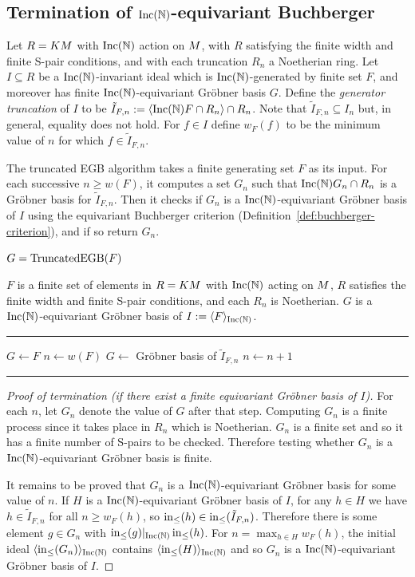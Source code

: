\subsection{Termination of $\operatorname{Inc}(\mathbb N)$-equivariant Buchberger}
Let $R = KM$ with $\operatorname{Inc}(\mathbb N)$ action on $M$, with $R$ satisfying the finite width and finite S-pair conditions, and with each truncation $R_n$ a Noetherian ring.  Let $I \subseteq R$ be a $\operatorname{Inc}(\mathbb N)$-invariant ideal which is $\operatorname{Inc}(\mathbb N)$-generated by finite set $F$, and moreover has finite $\operatorname{Inc}(\mathbb N)$-equivariant Gr\"obner basis $G$.  Define the {\em generator truncation} of $I$ to be $\tilde{I}_{F,n} := \langle \operatorname{Inc}(\mathbb N) F \cap R_n \rangle \cap R_n$.  Note that $\tilde{I}_{F,n} \subseteq I_n$ but, in general, equality does not hold.  For $f \in I$ define $w_F(f)$ to be the minimum value of $n$ for which $f \in \tilde{I}_{F,n}$.

The truncated EGB algorithm takes a finite generating set $F$ as its input.  For each successive $n \geq w(F)$, it computes a set $G_n$ such that $\operatorname{Inc}(\mathbb N) G_n \cap R_n$ is a Gr\"obner basis for $\tilde{I}_{F,n}$.  Then it checks if $G_n$ is a $\operatorname{Inc}(\mathbb N)$-equivariant Gr\"obner basis of $I$ using the equivariant Buchberger criterion (Definition~\ref{def:buchberger-criterion}), and if so return $G_n$.

\begin{algorithm}\label{alg:truncBuch}
$G = \operatorname{TruncatedEGB}(F)$
\begin{algorithmic}[1]
\REQUIRE $F$ is a finite set of elements in $R = KM$ with $\operatorname{Inc}(\mathbb N)$ acting on $M$, $R$ satisfies the finite width and finite S-pair conditions, and each $R_n$ is Noetherian.
\ENSURE $G$ is a $\operatorname{Inc}(\mathbb N)$-equivariant Gr\"obner basis of $I := \langle F \rangle_{\operatorname{Inc}(\mathbb N)}$.

\smallskip \hrule \smallskip

\STATE $G\gets F$
\STATE $n\gets w(F)$
	\STATE $G\gets$ Gr\"obner basis of $\tilde{I}_{F,n}$
	\STATE $n \gets n+1$
\ENDWHILE
\smallskip \hrule \smallskip
\end{algorithmic}
\end{algorithm}

\begin{proof}[Proof of termination (if there exist a finite equivariant Gr\"obner basis of $I$)]
For each $n$, let $G_n$ denote the value of $G$ after that step.  Computing $G_n$ is a finite process since it takes place in $R_n$ which is Noetherian.  $G_n$ is a finite set and so it has a finite number of S-pairs to be checked.  Therefore testing whether $G_n$ is a $\operatorname{Inc}(\mathbb N)$-equivariant Gr\"obner basis is finite.

It remains to be proved that $G_n$ is a $\operatorname{Inc}(\mathbb N)$-equivariant Gr\"obner basis for some value of $n$.  If $H$ is a $\operatorname{Inc}(\mathbb N)$-equivariant Gr\"obner basis of $I$, for any $h \in H$ we have $h \in \tilde{I}_{F,n}$ for all $n \geq w_F(h)$, so $\operatorname{in}_{\leq}(h) \in \operatorname{in}_{\leq}(\tilde{I}_{F,n})$.  Therefore there is some element $g \in G_n$ with $\operatorname{in}_{\leq}(g)|_{\operatorname{Inc}(\mathbb N)} \operatorname{in}_{\leq}(h)$.  For $n = \max_{h\in H} w_F(h)$, the initial ideal $\langle \operatorname{in}_{\leq}(G_n) \rangle_{\operatorname{Inc}(\mathbb N)}$ contains $\langle \operatorname{in}_{\leq}(H) \rangle_{\operatorname{Inc}(\mathbb N)}$ and so $G_n$ is a $\operatorname{Inc}(\mathbb N)$-equivariant Gr\"obner basis of $I$.
\end{proof}

